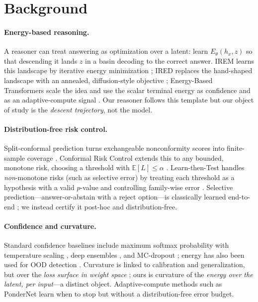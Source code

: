 \section{Background}
\label{sec:background}

\paragraph{Energy-based reasoning.} A reasoner can treat answering as optimization over a latent:
learn $E_\theta(h_x,z)$ so that descending it lands $z$ in a basin decoding to the correct answer.
IREM learns this landscape by iterative energy minimization \citep{irem2022}; IRED replaces the
hand-shaped landscape with an annealed, diffusion-style objective \citep{ired2024}; Energy-Based
Transformers scale the idea and use the scalar terminal energy as confidence and as an adaptive-compute
signal \citep{ebt2025}. Our reasoner follows this template but our object of study is the
\emph{descent trajectory}, not the model.

\paragraph{Distribution-free risk control.} Split-conformal prediction turns exchangeable
nonconformity scores into finite-sample coverage \citep{conformalintro2021}. Conformal Risk Control
extends this to any bounded, monotone risk, choosing a threshold with $\mathbb E[L]\le\alpha$
\citep{crc2022}. Learn-then-Test handles \emph{non}-monotone risks (such as selective error) by
treating each threshold as a hypothesis with a valid $p$-value and controlling family-wise error
\citep{ltt2021}. Selective prediction---answer-or-abstain with a reject option---is classically
learned end-to-end \citep{selectivenet2019}; we instead certify it post-hoc and distribution-free.

\paragraph{Confidence and curvature.} Standard confidence baselines include maximum softmax
probability with temperature scaling \citep{tempscaling2017}, deep ensembles \citep{deepensembles2017},
and MC-dropout \citep{mcdropout2016}; energy has also been used for OOD detection \citep{energyood2020}.
Curvature is linked to calibration and generalization, but over the \emph{loss surface in weight
space} \citep{sam2020,toosharp2026}; ours is curvature of the \emph{energy over the latent, per
input}---a distinct object. Adaptive-compute methods such as PonderNet learn when to stop
\citep{pondernet2021} but without a distribution-free error budget.
